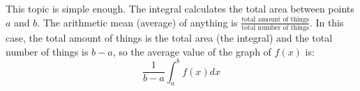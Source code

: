 \documentclass[../revisedmain.tex]{subfiles}
\begin{document}
This topic is simple enough. The integral calculates the total area between points $a$ and $b$. The arithmetic mean (average) of anything is $\displaystyle\frac{\text{total amount of things}}{\text{total number of things}}$. In this case, the total amount of things is the total area (the integral) and the total number of things is $b-a$, so the average value of the graph of $f(x)$ is:$$\frac{1}{b-a}\int_{a}^{b}f(x)dx$$	
\end{document}
